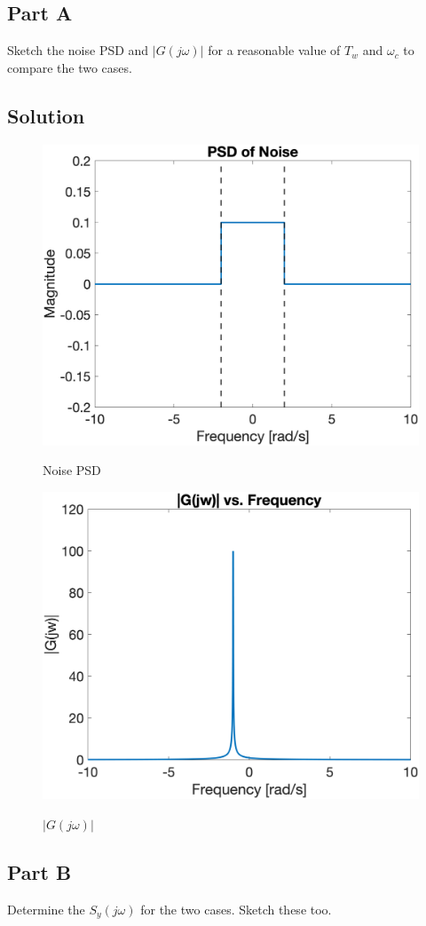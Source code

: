 \documentclass{article}
\begin{document}
\subsection*{Part A}
Sketch the noise PSD and $|G(j\omega)|$ for a reasonable value of $T_w$ and $\omega_c$ to compare the two cases.
\subsection*{Solution}
\begin{figure}[H]
    \centering
    \includegraphics[width=0.75\linewidth]{../figures/p5_noise_psd.png}\label{fig:p5_noise_psd}
    \caption{Noise PSD}
\end{figure}
\begin{figure}[H]
    \centering
    \includegraphics[width=0.75\linewidth]{../figures/p5_gjw.png}\label{fig:p5_gjw}
    \caption{$|G(j\omega)|$}
\end{figure}

\subsection*{Part B}
Determine the $S_y(j\omega)$ for the two cases.  Sketch these too.
\end{document}
